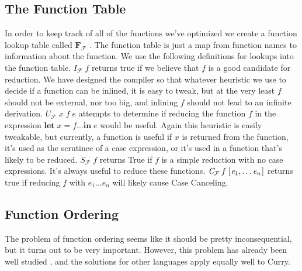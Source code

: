 \documentclass{book}
\theoremstyle{definition}
\newcommand{\Conid}[1]{\mathit{#1}}
\newcommand{\Varid}[1]{\mathit{#1}}
\begin{document}
\subsection{The Function Table} \label{sec:funTab}
In order to keep track of all of the functions we've optimized we create a function lookup table
called \ensuremath{\textbf{F} _\mathcal{F} } .
The function table is just a map from function names to information about the function.
We use the following definitions for lookups into the function table.
\ensuremath{\Conid{I}_\mathcal{F} \;\Varid{f}}  returns true if we believe that \ensuremath{\Varid{f}}
is a good candidate for reduction.
We have designed the compiler so that whatever heuristic we use to decide
if a function can be inlined, it is easy to tweak,
but at the very least \ensuremath{\Varid{f}} should not be external, nor too big, and inlining \ensuremath{\Varid{f}}
should not lead to an infinite derivation.
\ensuremath{\Conid{U}_\mathcal{F} \;\Varid{x}\;\Varid{f}\;\Varid{e}}  attempts to determine if reducing the function \ensuremath{\Varid{f}} 
in the expression \ensuremath{\mathbf{let}\;\Varid{x}\mathrel{=}\Varid{f}\ldots \mathbf{in}\;\Varid{e}} would be useful.
Again this heuristic is easily tweakable, but currently,
a function is useful if \ensuremath{\Varid{x}} is returned from the function,
it's used as the scrutinee of a case expression,
or it's used in a function that's likely to be reduced.
\ensuremath{\Conid{S}_\mathcal{F} \;\Varid{f}}  returns True if \ensuremath{\Varid{f}} is a simple reduction with no case expressions.
It's always useful to reduce these functions.
\ensuremath{\Conid{C}_\mathcal{F} \;\Varid{f}\;[\mskip1.5mu \Varid{e}_{\mathrm{1}},\ldots \Varid{e}_{\Varid{n}}\mskip1.5mu]}  returns true if reducing \ensuremath{\Varid{f}} with \ensuremath{\Varid{e}_{\mathrm{1}}\ldots \Varid{e}_{\Varid{n}}}
will likely cause Case Canceling.


\subsection{Function Ordering}

The problem of function ordering seems like it should be pretty inconsequential,
but it turns out to be very important.
However, this problem has already been well studied \cite{CarruthInline, haskellInliner},
and the solutions for other languages apply equally well to Curry.
\end{document}
